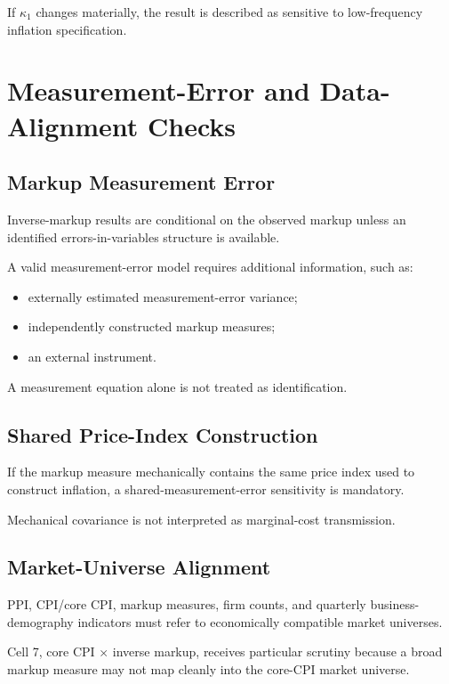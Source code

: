 \documentclass[11pt]{article}
\begin{document}
If \(\kappa_1\) changes materially, the result is described as sensitive to low-frequency inflation specification.

\section{Measurement-Error and Data-Alignment Checks}

\subsection{Markup Measurement Error}

Inverse-markup results are conditional on the observed markup unless an identified errors-in-variables structure is available.

A valid measurement-error model requires additional information, such as:
\begin{itemize}
\item externally estimated measurement-error variance;
\item independently constructed markup measures;
\item an external instrument.
\end{itemize}

A measurement equation alone is not treated as identification.

\subsection{Shared Price-Index Construction}

If the markup measure mechanically contains the same price index used to construct inflation, a shared-measurement-error sensitivity is mandatory.

Mechanical covariance is not interpreted as marginal-cost transmission.

\subsection{Market-Universe Alignment}

PPI, CPI/core CPI, markup measures, firm counts, and quarterly business-demography indicators must refer to economically compatible market universes.

Cell 7, core CPI \(\times\) inverse markup, receives particular scrutiny because a broad markup measure may not map cleanly into the core-CPI market universe.
\end{document}
